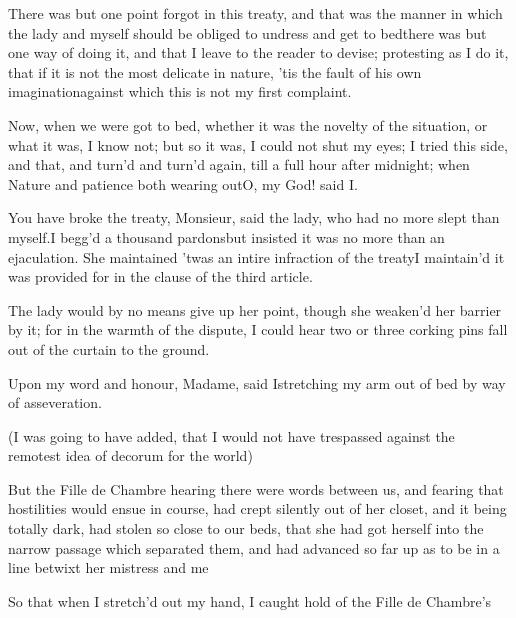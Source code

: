 \documentclass[twoside]{article}
\begin{document}
There was but one point forgot in this
treaty, and that was the manner in which
the lady and myself should be obliged to
undress and get to bed\tskk there was but
one way of doing it, and that I leave to
the reader to devise; protesting as I do
it, that if it is not the most delicate in
nature, ’tis the fault of his own
imagination\tskk against which this is
not my first complaint.

Now, when we were got to bed, whether it
was the novelty of the situation, or what
it was, I know not; but so it was, I could
not shut my eyes; I tried this side, and
that, and turn’d and turn’d again, till a
full hour after midnight; when Nature and
patience both wearing out\tskk O, my God!
said I.

\tskk You have broke the treaty, Monsieur,
said the lady, who had no more slept than
myself.\tskk I begg’d a thousand
pardons\tskk but insisted it was no more
than an ejaculation.  She maintained ’twas
an intire infraction of the treaty\tskk I
maintain’d it was provided for in the
clause of the third article.

The lady would by no means give up her
point, though she weaken’d her barrier by
it; for in the warmth of the dispute, I
could hear two or three corking pins fall
out of the curtain to the ground.

Upon my word and honour, Madame, said
I\tskk stretching my arm out of bed by
way of asseveration.\tskk 

(I was going to have added, that I would
not have trespassed against the remotest
idea of decorum for the world)\tskk 

But the Fille de Chambre hearing there
were words between us, and fearing that
hostilities would ensue in course, had
crept silently out of her closet, and it
being totally dark, had stolen so close to
our beds, that she had got herself into
the narrow passage which separated them,
and had advanced so far up as to be in a
line betwixt her mistress and me\tskk 

So that when I stretch’d out my
hand, I caught hold of the Fille de
Chambre’s

\end{document}
